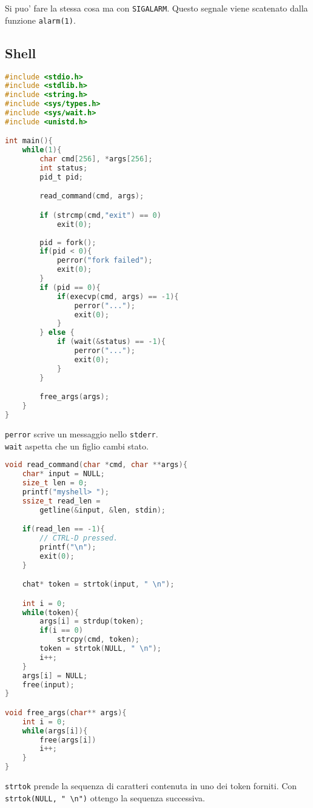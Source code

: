 Si puo' fare la stessa cosa ma con \texttt{SIGALARM}.
Questo segnale viene scatenato dalla funzione \texttt{alarm(1)}.

\subsection{Shell}
\begin{lstlisting}[language=c]
#include <stdio.h>
#include <stdlib.h>
#include <string.h>
#include <sys/types.h>
#include <sys/wait.h>
#include <unistd.h>

int main(){
    while(1){
        char cmd[256], *args[256];
        int status;
        pid_t pid;

        read_command(cmd, args);

        if (strcmp(cmd,"exit") == 0) 
            exit(0);
        
        pid = fork();
        if(pid < 0){
            perror("fork failed");
            exit(0);
        }
        if (pid == 0){
            if(execvp(cmd, args) == -1){
                perror("...");
                exit(0);
            }
        } else {
            if (wait(&status) == -1){
                perror("...");
                exit(0);
            }
        }

        free_args(args);
    }
}
\end{lstlisting}

\texttt{perror} scrive un messaggio nello \texttt{stderr}. \\
\texttt{wait} aspetta che un figlio cambi stato.

\begin{lstlisting}[language=c]
void read_command(char *cmd, char **args){
    char* input = NULL;
    size_t len = 0;
    printf("myshell> ");
    ssize_t read_len = 
        getline(&input, &len, stdin);

    if(read_len == -1){
        // CTRL-D pressed.
        printf("\n");
        exit(0);
    }

    chat* token = strtok(input, " \n");

    int i = 0;
    while(token){
        args[i] = strdup(token);
        if(i == 0)
            strcpy(cmd, token);
        token = strtok(NULL, " \n");
        i++;
    }
    args[i] = NULL;
    free(input);
}

void free_args(char** args){
    int i = 0;
    while(args[i]){
        free(args[i])
        i++;
    }
}
\end{lstlisting}

\texttt{strtok} prende la sequenza di caratteri contenuta in uno 
dei token forniti. Con \lstinline{strtok(NULL, " \n")} ottengo la sequenza successiva.

